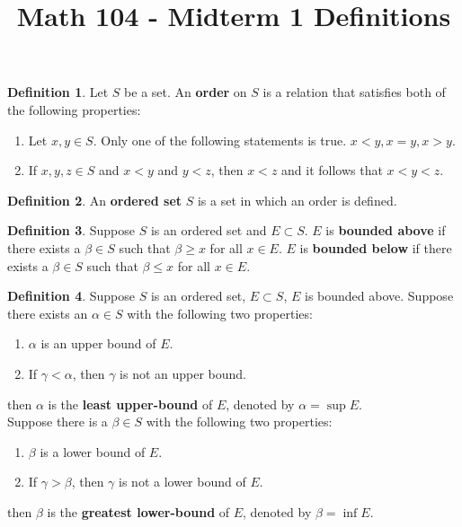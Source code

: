 \documentclass[12pt]{article}
\theoremstyle{definition}
\newtheorem{definition}{Definition}
\theoremstyle{named}
\newcounter{customDef}
\begin{document}
\title{Math 104 - Midterm 1 Definitions}
\author{}
\date{}
\maketitle
\date

\setcounter{customDef}{0}
\renewcommand{\thedefinition}{1.5}
\begin{definition}
    Let $S$ be a set. An \textbf{order} on $S$ is a relation that satisfies both of the following properties:
    \begin{enumerate} 
        \item Let $x,y \in S$. Only one of the following statements is true. $x<y, x=y, x>y$. 
        \item If $x,y,z \in S$ and $x<y$ and $y<z$, then $x<z$ and it follows that $x<y<z$.
    \end{enumerate}
\end{definition}

\setcounter{customDef}{0}
\renewcommand{\thedefinition}{1.6}
\begin{definition}
    An \textbf{ordered set} $S$ is a set in which an order is defined.
\end{definition}

\setcounter{customDef}{0}
\renewcommand{\thedefinition}{1.7}
\begin{definition}
    Suppose $S$ is an ordered set and $E \subset S$. $E$ is \textbf{bounded above} if there exists a $\beta \in S$ such that $\beta \geq x$ for all $x \in E$. $E$ is \textbf{bounded below} if there exists a $\beta \in S$ such that $\beta \leq x$ for all $x \in E$. 
\end{definition}

\setcounter{customDef}{0}
\renewcommand{\thedefinition}{1.8}
\begin{definition}
    Suppose $S$ is an ordered set, $E \subset S$, $E$ is bounded above. Suppose there exists an $\alpha \in S$ with the following two properties:
    \begin{enumerate}
        \item $\alpha$ is an upper bound of $E$.
        \item If $\gamma < \alpha$, then $\gamma$ is not an upper bound.
    \end{enumerate}
    then $\alpha$ is the \textbf{least upper-bound} of $E$, denoted by $\alpha = \sup E$. 
    \\
    Suppose there is a $\beta \in S$ with the following two properties: 
    \begin{enumerate}
        \item $\beta$ is a lower bound of $E$.
        \item If $\gamma > \beta$, then $\gamma$ is not a lower bound of $E$.
    \end{enumerate}
    then $\beta$ is the \textbf{greatest lower-bound} of $E$, denoted by $\beta = \inf E$. 
\end{definition}
\end{document}
